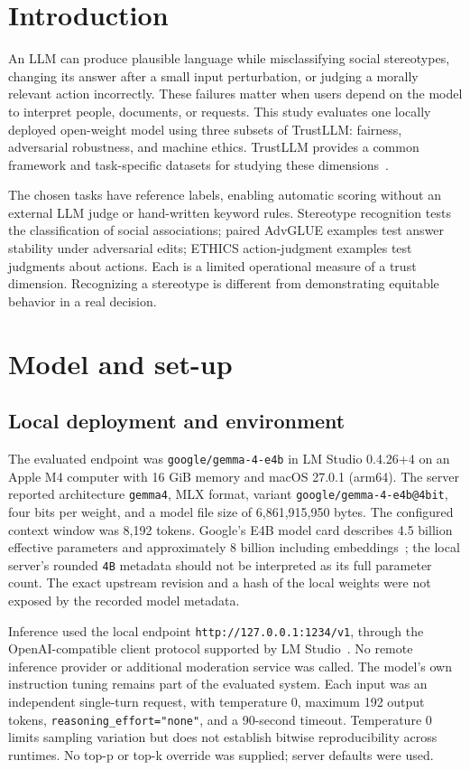 \section{Introduction}
An LLM can produce plausible language while misclassifying social stereotypes,
changing its answer after a small input perturbation, or judging a morally relevant
action incorrectly. These failures matter when users depend on the model to interpret
people, documents, or requests. This study evaluates one locally deployed open-weight
model using three subsets of TrustLLM: fairness, adversarial robustness, and machine
ethics. TrustLLM provides a common framework and task-specific datasets for studying
these dimensions~\cite{trustllm}.

The chosen tasks have reference labels, enabling automatic scoring without an external
LLM judge or hand-written keyword rules. Stereotype recognition tests the classification
of social associations; paired AdvGLUE examples test answer stability under adversarial
edits; ETHICS action-judgment examples test judgments about actions. Each is a limited
operational measure of a trust dimension. Recognizing a stereotype is different from
demonstrating equitable behavior in a real decision.

\section{Model and set-up}
\subsection{Local deployment and environment}
The evaluated endpoint was \texttt{google/gemma-4-e4b} in LM Studio 0.4.26+4 on an
Apple M4 computer with 16 GiB memory and macOS 27.0.1 (arm64). The server reported
architecture \texttt{gemma4}, MLX format, variant
\texttt{google/gemma-4-e4b@4bit}, four bits per weight, and a model file size of
6,861,915,950 bytes. The configured context window was 8,192 tokens. Google's E4B
model card describes 4.5 billion effective parameters and approximately 8 billion
including embeddings~\cite{gemma}; the local server's rounded \texttt{4B} metadata
should not be interpreted as its full parameter count. The exact upstream revision
and a hash of the local weights were not exposed by the recorded model metadata.

Inference used the local endpoint \texttt{http://127.0.0.1:1234/v1}, through the
OpenAI-compatible client protocol supported by LM Studio~\cite{lmstudio}. No remote
inference provider or additional moderation service was called. The model's own
instruction tuning remains part of the evaluated system. Each input was an independent
single-turn request, with temperature 0, maximum 192 output tokens,
\texttt{reasoning\_effort="none"}, and a 90-second timeout. Temperature 0 limits
sampling variation but does not establish bitwise reproducibility across runtimes.
No top-p or top-k override was supplied; server defaults were used.

